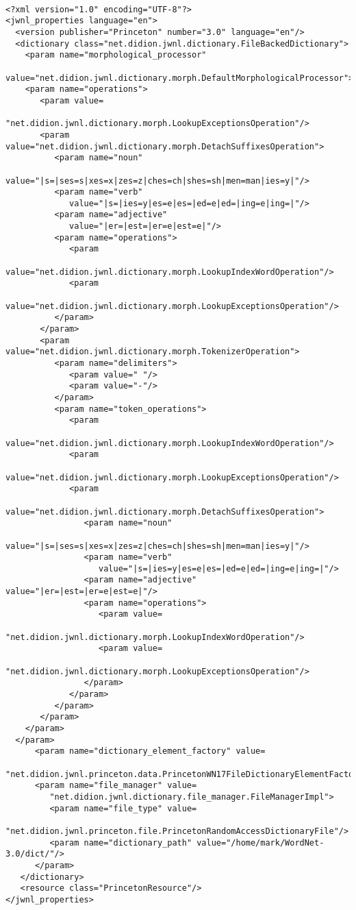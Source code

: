 \begin{small}
\begin{verbatim}

<?xml version="1.0" encoding="UTF-8"?>
<jwnl_properties language="en">
  <version publisher="Princeton" number="3.0" language="en"/>
  <dictionary class="net.didion.jwnl.dictionary.FileBackedDictionary">
    <param name="morphological_processor"
       value="net.didion.jwnl.dictionary.morph.DefaultMorphologicalProcessor">
    <param name="operations">
       <param value=
          "net.didion.jwnl.dictionary.morph.LookupExceptionsOperation"/>
       <param value="net.didion.jwnl.dictionary.morph.DetachSuffixesOperation">
          <param name="noun" 
             value="|s=|ses=s|xes=x|zes=z|ches=ch|shes=sh|men=man|ies=y|"/>
          <param name="verb" 
             value="|s=|ies=y|es=e|es=|ed=e|ed=|ing=e|ing=|"/>
          <param name="adjective" 
             value="|er=|est=|er=e|est=e|"/>
          <param name="operations">
             <param 
                value="net.didion.jwnl.dictionary.morph.LookupIndexWordOperation"/>
             <param 
                value="net.didion.jwnl.dictionary.morph.LookupExceptionsOperation"/>
          </param>
       </param>
       <param value="net.didion.jwnl.dictionary.morph.TokenizerOperation">
          <param name="delimiters">
             <param value=" "/>
             <param value="-"/>
          </param>
          <param name="token_operations">
             <param 
                value="net.didion.jwnl.dictionary.morph.LookupIndexWordOperation"/>
             <param 
                value="net.didion.jwnl.dictionary.morph.LookupExceptionsOperation"/>
             <param 
                value="net.didion.jwnl.dictionary.morph.DetachSuffixesOperation">
                <param name="noun" 
                   value="|s=|ses=s|xes=x|zes=z|ches=ch|shes=sh|men=man|ies=y|"/>
                <param name="verb" 
                   value="|s=|ies=y|es=e|es=|ed=e|ed=|ing=e|ing=|"/>
                <param name="adjective" value="|er=|est=|er=e|est=e|"/>
                <param name="operations">
                   <param value=
                      "net.didion.jwnl.dictionary.morph.LookupIndexWordOperation"/>
                   <param value=
                      "net.didion.jwnl.dictionary.morph.LookupExceptionsOperation"/>
                </param>
             </param>
          </param>
       </param>
    </param>
  </param>
      <param name="dictionary_element_factory" value=
         "net.didion.jwnl.princeton.data.PrincetonWN17FileDictionaryElementFactory"/>
      <param name="file_manager" value=
         "net.didion.jwnl.dictionary.file_manager.FileManagerImpl">
         <param name="file_type" value=
            "net.didion.jwnl.princeton.file.PrincetonRandomAccessDictionaryFile"/>
         <param name="dictionary_path" value="/home/mark/WordNet-3.0/dict/"/>
      </param>
   </dictionary>
   <resource class="PrincetonResource"/>
</jwnl_properties>
\end{verbatim}
\end{small}

